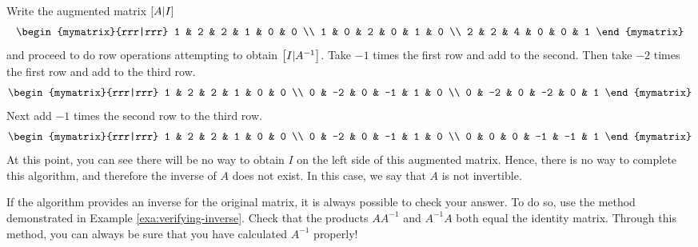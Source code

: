 \begin{solution} Write the augmented matrix $\left[A|I\right] $
  \begin{equation*}
    \begin{mymatrix}{rrr|rrr}
      1 & 2 & 2 & 1 & 0 & 0 \\
      1 & 0 & 2 & 0 & 1 & 0 \\
      2 & 2 & 4 & 0 & 0 & 1
    \end{mymatrix}
  \end{equation*}
  and proceed to do row operations attempting to obtain
  $\left[I|A^{-1}\right]$. Take $-1$ times the first row and add to the
  second. Then take $ -2 $ times the first row and add to the third
  row.
  \begin{equation*}
    \begin{mymatrix}{rrr|rrr}
      1 & 2 & 2 & 1 & 0 & 0 \\
      0 & -2 & 0 & -1 & 1 & 0 \\
      0 & -2 & 0 & -2 & 0 & 1
    \end{mymatrix}
  \end{equation*}
  Next add $-1 $ times the second row to the third row.
  \begin{equation*}
    \begin{mymatrix}{rrr|rrr}
      1 & 2 & 2 & 1 & 0 & 0 \\
      0 & -2 & 0 & -1 & 1 & 0 \\
      0 & 0 & 0 & -1 & -1 & 1
    \end{mymatrix}
  \end{equation*}
  At this point, you can see there will be no way to obtain $I$ on the
  left side of this augmented matrix.  Hence, there is no way to
  complete this algorithm, and therefore the inverse of $A$ does not
  exist. In this case, we say that $A$ is not invertible.
\end{solution}

If the algorithm provides an inverse for the original matrix, it is
always possible to check your answer.  To do so, use the method
demonstrated in Example \ref{exa:verifying-inverse}. Check that the
products $AA^{-1}$ and $A^{-1}A$ both equal the identity
matrix. Through this method, you can always be sure that you have
calculated $A^{-1}$ properly!

